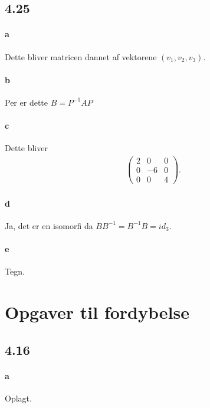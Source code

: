 		\subsection{4.25}

			\paragraph{a} Dette bliver matricen dannet af vektorene $(v_1,v_2,v_3)$.

			\paragraph{b} Per \cite[Sætning 4.4.14]{hesselholt2017} er dette $B=P^{-1}AP$

			\paragraph{c} Dette bliver
				\begin{align*}
					\left(\begin{array}{rrr} {2} & {0} & {0} \\ {0} & {-6} & {0} \\ 0 & 0 & 4 \end{array}\right).
				\end{align*} 

			\paragraph{d} Ja, det er en isomorfi da $BB^{-1}=B^{-1}B=id_3$.

			\paragraph{e} Tegn.



	\section{Opgaver til fordybelse}

		\subsection{4.16}

			\paragraph{a} Oplagt.


